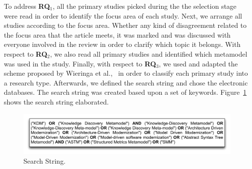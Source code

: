 






To address \textbf{RQ$_1$}, all the primary studies picked during the the selection stage were  read in order to identify the focus area of each study. Next, we arrange all studies according to the focus area. Whether any kind of disagreement related to the focus area that the article meets, it was marked and was discussed with everyone involved in the review in order to clarify which topic it belongs. With respect to \textbf{RQ$_2$}, we also read all primary studies and identified which metamodel was used in the study. Finally, with respect to \textbf{RQ$_3$}, we used and adapted the scheme proposed by Wieringa et al.,~\cite{Wieringa:2005:REP:1107677.1107683} in order to classify each primary study into a research type. %
Afterwards, we defined the search string and chose the electronic databases. The search string was created based upon a set of keywords. Figure~\ref{search_string} shows the search string elaborated. 

\begin{figure}[!h]
\centering
  \includegraphics[scale=0.35]{figuras/SearchStringADM}
\caption{Search String.}
\label{search_string}
\end{figure} 

